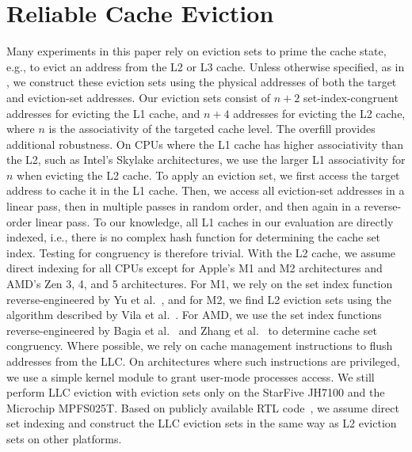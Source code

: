 \documentclass[letterpaper,twocolumn,10pt]{article} %
\begin{document}
\section{Reliable Cache Eviction}\label{sec:reliable-cache-eviction}
Many experiments in this paper rely on eviction sets to prime the cache state, e.g., to evict an address from the L2 or L3 cache.
Unless otherwise specified, as in , we construct these eviction sets using the physical addresses of both the target and eviction-set addresses.
Our eviction sets consist of $n + 2$ set-index-congruent addresses for evicting the L1 cache, and $n + 4$ addresses for evicting the L2 cache, where $n$ is the associativity of the targeted cache level.
The overfill provides additional robustness.
On CPUs where the L1 cache has higher associativity than the L2, such as Intel's Skylake architectures, we use the larger L1 associativity for $n$ when evicting the L2 cache.
To apply an eviction set, we first access the target address to cache it in the L1 cache.
Then, we access all eviction-set addresses in a linear pass, then in multiple passes in random order, and then again in a reverse-order linear pass.
To our knowledge, all L1 caches in our evaluation are directly indexed, i.e., there is no complex hash function for determining the cache set index.
Testing for congruency is therefore trivial.
With the L2 cache, we assume direct indexing for all CPUs except for Apple's M1 and M2 architectures and AMD's Zen 3, 4, and 5 architectures.
For M1, we rely on the set index function reverse-engineered by Yu et al.~\cite{Yu2023Synchronization}, and for M2, we find L2 eviction sets using the algorithm described by Vila et al.~\cite{Vila2019}.
For AMD, we use the set index functions reverse-engineered by Bagia et al.~\cite{bagia2025close} and Zhang et al.~\cite{Zhang2025Taming} to determine cache set congruency.
Where possible, we rely on cache management instructions to flush addresses from the LLC\@.
On architectures where such instructions are privileged, we use a simple kernel module to grant user-mode processes access.
We still perform LLC eviction with eviction sets only on the StarFive JH7100 and the Microchip MPFS025T.
Based on publicly available RTL code~\cite{sifive-inclusivecache}, we assume direct set indexing and construct the LLC eviction sets in the same way as L2 eviction sets on other platforms.
\end{document}
